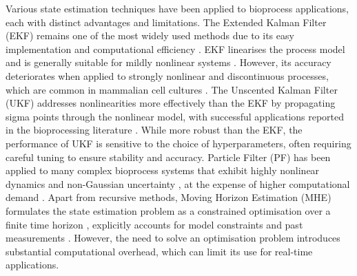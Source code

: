 Various state estimation techniques have been applied to bioprocess applications, each with distinct advantages and limitations. The Extended Kalman Filter (EKF) remains one of the most widely used methods due to its easy implementation and computational efficiency \cite{Ohadi2015DevelopmentCultures, Kramer2016On-lineCerevisiae, Gopalakrishnan2011IncorporatingEstimation, Narayanan2020Hybrid-EKF:Culture, 
Dewasme2019StateValidation, Bogaerts2004ParameterSensors, Ulonska2018ModelFed-batch}. EKF linearises the process model and is generally suitable for mildly nonlinear systems \cite{Lyubenova2021Model-basedReview}. However, its accuracy deteriorates when applied to strongly nonlinear and discontinuous processes, which are common in mammalian cell cultures \cite{Yousefi-Darani2021TheProcesses}. The Unscented Kalman Filter (UKF) addresses nonlinearities more effectively than the EKF by propagating sigma points through the nonlinear model, with successful applications reported in the bioprocessing literature \cite{Fernandes2015ExtendedCultures, Dewasme2015StateCells, Abadli2021AnCultures, Kramer2019AFilter, Kolas2009ConstrainedApproach, Yousefi-Darani2021ParameterFilter, Paquet-Durand2022Online, Kemmer2023NonlinearCultivations}. While more robust than the EKF, the performance of UKF is sensitive to the choice of hyperparameters, often requiring careful tuning to ensure stability and accuracy. Particle Filter (PF) has been applied to many complex bioprocess systems that exhibit highly nonlinear dynamics and non-Gaussian uncertainty \cite{Golabgir2016CombiningProduction, Stelzer2017ComparisonBioprocesses, Kager2019ExtensionMeasurements, Sinner2022OnlineMixture, Kager2018StateMeasurements}, at the expense of higher computational demand \cite{Elfring2021ParticleTutorial}. Apart from recursive methods, Moving Horizon Estimation (MHE) formulates the state estimation problem as a constrained optimisation over a finite time horizon \cite{Robertson1996AEstimation, Rao2001ConstrainedApproach, Haseltine2005CriticalEstimation}, explicitly accounts for model constraints and past measurements \cite{Tuveri2022BioprocessApplication, HernandezRodriguez2021DynamicTrain, Alexander2020ChallengesProcesses}. However, the need to solve an optimisation problem introduces substantial computational overhead, which can limit its use for real-time applications.

